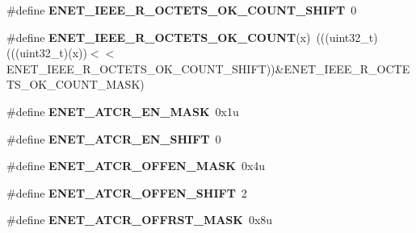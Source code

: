 \begin{DoxyCompactItemize}
\item 
\#define {\bfseries E\+N\+E\+T\+\_\+\+I\+E\+E\+E\+\_\+\+R\+\_\+\+O\+C\+T\+E\+T\+S\+\_\+\+O\+K\+\_\+\+C\+O\+U\+N\+T\+\_\+\+S\+H\+I\+FT}~0\hypertarget{group__ENET__Register__Masks_ga8a406cf6c9e91cc4a0217bd3f885ab05}{}\label{group__ENET__Register__Masks_ga8a406cf6c9e91cc4a0217bd3f885ab05}

\item 
\#define {\bfseries E\+N\+E\+T\+\_\+\+I\+E\+E\+E\+\_\+\+R\+\_\+\+O\+C\+T\+E\+T\+S\+\_\+\+O\+K\+\_\+\+C\+O\+U\+NT}(x)~(((uint32\+\_\+t)(((uint32\+\_\+t)(x))$<$$<$E\+N\+E\+T\+\_\+\+I\+E\+E\+E\+\_\+\+R\+\_\+\+O\+C\+T\+E\+T\+S\+\_\+\+O\+K\+\_\+\+C\+O\+U\+N\+T\+\_\+\+S\+H\+I\+FT))\&E\+N\+E\+T\+\_\+\+I\+E\+E\+E\+\_\+\+R\+\_\+\+O\+C\+T\+E\+T\+S\+\_\+\+O\+K\+\_\+\+C\+O\+U\+N\+T\+\_\+\+M\+A\+SK)\hypertarget{group__ENET__Register__Masks_ga45f6f91b88631d8bf05f2fdf05687bde}{}\label{group__ENET__Register__Masks_ga45f6f91b88631d8bf05f2fdf05687bde}

\item 
\#define {\bfseries E\+N\+E\+T\+\_\+\+A\+T\+C\+R\+\_\+\+E\+N\+\_\+\+M\+A\+SK}~0x1u\hypertarget{group__ENET__Register__Masks_gad410926040b6756be05d2278d21dea59}{}\label{group__ENET__Register__Masks_gad410926040b6756be05d2278d21dea59}

\item 
\#define {\bfseries E\+N\+E\+T\+\_\+\+A\+T\+C\+R\+\_\+\+E\+N\+\_\+\+S\+H\+I\+FT}~0\hypertarget{group__ENET__Register__Masks_gaf76be9f51320e23fe6b987d73a2b167b}{}\label{group__ENET__Register__Masks_gaf76be9f51320e23fe6b987d73a2b167b}

\item 
\#define {\bfseries E\+N\+E\+T\+\_\+\+A\+T\+C\+R\+\_\+\+O\+F\+F\+E\+N\+\_\+\+M\+A\+SK}~0x4u\hypertarget{group__ENET__Register__Masks_ga101674b5d969a97f418b6e7e60b4814d}{}\label{group__ENET__Register__Masks_ga101674b5d969a97f418b6e7e60b4814d}

\item 
\#define {\bfseries E\+N\+E\+T\+\_\+\+A\+T\+C\+R\+\_\+\+O\+F\+F\+E\+N\+\_\+\+S\+H\+I\+FT}~2\hypertarget{group__ENET__Register__Masks_gace9d24d80cada8d29ddfc2d9c97595ba}{}\label{group__ENET__Register__Masks_gace9d24d80cada8d29ddfc2d9c97595ba}

\item 
\#define {\bfseries E\+N\+E\+T\+\_\+\+A\+T\+C\+R\+\_\+\+O\+F\+F\+R\+S\+T\+\_\+\+M\+A\+SK}~0x8u\hypertarget{group__ENET__Register__Masks_ga95712a56ae929380d83cd69b67781877}{}\label{group__ENET__Register__Masks_ga95712a56ae929380d83cd69b67781877}


\end{DoxyCompactItemize}

